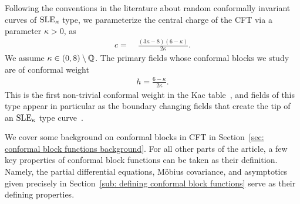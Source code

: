 \documentclass[oneside,english]{amsart}
\numberwithin{equation}{section}
\numberwithin{figure}{section}
\theoremstyle{plain}
\theoremstyle{plain}
\theoremstyle{plain}
\theoremstyle{remark}
\theoremstyle{plain}
\theoremstyle{plain}
\theoremstyle{plain}
\theoremstyle{plain}
\theoremstyle{plain}
\theoremstyle{plain}
\theoremstyle{plain}
\theoremstyle{plain}
\begin{document}
Following the conventions in the literature about random conformally invariant curves of $\mathrm{SLE}_{\kappa}$ type, we parameterize
the central charge of the %
CFT via a parameter $\kappa > 0$, as
\begin{align} \label{eq: central charge parametrization}
c=\; & \frac{(3\kappa-8)(6-\kappa)}{2\kappa} . 
\end{align}
We assume $\kappa \in (0,8) \setminus \mathbb{Q}$.
The primary fields whose conformal blocks we study are of conformal weight
\begin{align*}
h = \frac{6 - \kappa}{2 \kappa} .
\end{align*}
This is the first non-trivial conformal weight in the Kac table~\cite{Kac-ICM_proceedings_Helsinki}, and
fields of this type appear in particular as the boundary changing fields that
create the tip of an $\mathrm{SLE}_{\kappa}$ type curve~\cite{BB-SLE_martingales_and_Virasoro_algebra, BB-CFTs_of_SLEs,
FW-conformal_restriction_highest_weight_representations_and_SLE,
BBK-multiple_SLEs, Dubedat-commutation, Kytola-local_mgales, KM-GFF_and_CFT,
Dubedat-SLE_and_Virasoro_representations_localization}.


We cover some background on conformal blocks in CFT %
in Section~\ref{sec: conformal block functions background}.
For all other parts of the article, a few key properties
of conformal block functions can be taken as their definition.
Namely, the partial differential equations, M\"obius covariance, and
asymptotics given precisely in Section~\ref{sub: defining conformal block functions}
serve as their defining properties. %
\end{document}
